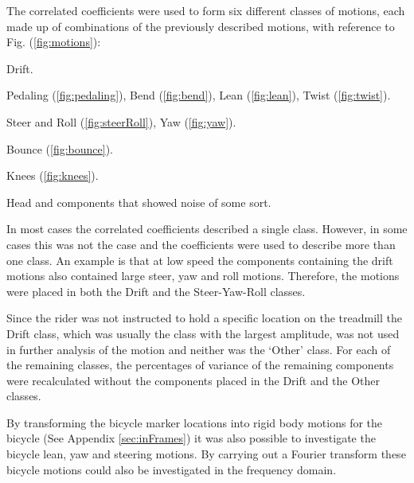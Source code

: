 The correlated coefficients were used to form six different classes of motions, each made up of combinations of the previously described motions, with reference to Fig. (\ref{fig:motions}):
\begin{description}
    \item[Drift] Drift.
    \item[Pedaling] Pedaling (\ref{fig:pedaling}), Bend (\ref{fig:bend}), Lean (\ref{fig:lean}), Twist (\ref{fig:twist}).
    \item[Steer-Yaw-Roll] Steer and Roll (\ref{fig:steerRoll}), Yaw (\ref{fig:yaw}).
    \item[Bounce] Bounce (\ref{fig:bounce}).
    \item[Knees] Knees (\ref{fig:knees}).
    \item[Others] Head and components that showed noise of some
    sort.
\end{description}

In most cases the correlated coefficients described a single class. However, in some cases this was not the case and the coefficients were used to describe more than one class. An example is that at low speed the components containing the drift motions also contained large steer, yaw and roll motions. Therefore, the motions were placed in both the Drift and the Steer-Yaw-Roll classes.

Since the rider was not instructed to hold a specific location on the treadmill the Drift class, which was usually the class with the
largest amplitude, was not used in further analysis of the motion and neither was the `Other' class. For each of the remaining classes, the percentages of variance of the remaining components were recalculated without the components placed in the Drift and the Other classes.

By transforming the bicycle marker locations into rigid body motions for the bicycle (See Appendix \ref{sec:inFrames}) it was also possible to investigate the bicycle lean, yaw and steering motions. By carrying out a Fourier transform these bicycle motions could also be investigated in the frequency domain.

